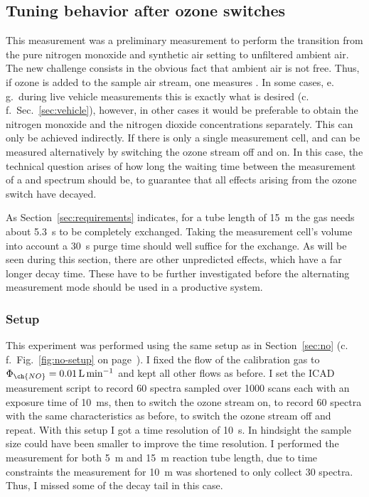 \subsection{Tuning behavior after ozone switches}
\label{sec:switch}

This measurement was a preliminary measurement to perform the
transition from the pure nitrogen monoxide and synthetic air setting
to unfiltered ambient air. The new challenge consists in the obvious
fact that ambient air is not  free. Thus, if ozone is added to
the sample air stream, one measures . In some
cases, e.\,g.\ during live vehicle measurements this is exactly what
is desired (c.\,f.~Sec.~\ref{sec:vehicle}), however, in other cases it
would be preferable to obtain the nitrogen monoxide and the nitrogen
dioxide concentrations separately. This can only be achieved
indirectly. If there is only a single measurement cell,  and
 can be measured alternatively by switching the ozone stream
off and on. In this case, the technical question arises of how long
the waiting time between the measurement of a  and 
spectrum should be, to guarantee that all effects arising from the
ozone switch have decayed.

As Section~\ref{sec:requirements} indicates, for a tube length of
\SI{15}{\meter} the gas needs about \SI{5.3}{\second} to be completely
exchanged. Taking the measurement cell's volume into account a
\SI{30}{\second} purge time should well suffice for the exchange. As
will be seen during this section, there are other unpredicted effects,
which have a far longer decay time. These have to be further
investigated before the alternating measurement mode should be used in
a productive system.

\subsubsection{Setup}
\label{sec:switch-setup}

This experiment was performed using the same setup as in
Section~\ref{sec:no} (c.\,f.\ Fig.~\ref{fig:no-setup} on
page~\pageref{fig:no-setup}). I fixed the flow of the 
calibration gas to $\Phi_{\ch{NO}} = \SI{0.01}{\liter\per\minute}$ and
kept all other flows as before. I set the ICAD measurement script to
record 60 spectra sampled over 1000 scans each with an exposure time
of \SI{10}{\milli\second}, then to switch the ozone stream on, to
record 60 spectra with the same characteristics as before, to switch
the ozone stream off and repeat. With this setup I got a time
resolution of \SI{10}{\second}. In hindsight the sample size could
have been smaller to improve the time resolution. I performed the
measurement for both \SI{5}{\meter} and \SI{15}{\meter} reaction tube
length, due to time constraints the measurement for \SI{10}{\meter}
was shortened to only collect 30 spectra. Thus, I missed some of the
decay tail in this case.

